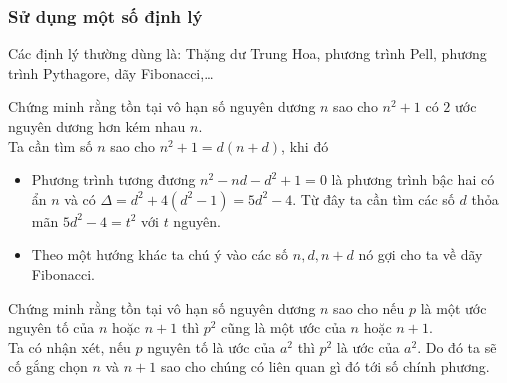\subsubsection{Sử dụng một số định lý}
Các định lý thường dùng là: Thặng dư Trung Hoa, phương trình Pell, phương trình Pythagore, dãy Fibonacci,\dots
\begin{bt}%
	Chứng minh rằng tồn tại vô hạn số nguyên dương $ n $ sao cho $ n^2+1 $ có $ 2 $ ước nguyên dương hơn kém nhau $ n $.\vspace{0.2cm}\\
	Ta cần tìm số $ n $ sao cho $ n^2+1=d(n+d) $, khi đó
	\begin{itemize}
		\item Phương trình tương đương $ n^2-nd-d^2+1=0 $ là phương trình bậc hai có ẩn $ n $ và có $ \Delta =d^2+4\left(d^2-1\right)=5d^2-4 $. Từ đây ta cần tìm các số $ d $ thỏa mãn $ 5d^2-4=t^2 $ với $ t $ nguyên.
		\item  Theo một hướng khác ta chú ý vào các số $ n, d, n+d $ nó gợi cho ta về dãy Fibonacci.
	\end{itemize}
\end{bt}
\begin{bt}%
	Chứng minh rằng tồn tại vô hạn số nguyên dương $ n $ sao cho nếu $ p $ là một ước nguyên tố của $ n $ hoặc $ n+1 $ thì $ p^2 $ cũng là một ước của $ n $ hoặc $ n+1 $.\vspace{0.2cm}\\
	Ta có nhận xét, nếu $ p $ nguyên tố  là ước của $ a^2 $ thì $ p^2 $ là ước của $ a^2 $. Do đó  ta sẽ cố gắng chọn $ n $ và $ n+1 $ sao cho chúng có liên quan gì  đó tới số  chính phương.
\end{bt}
